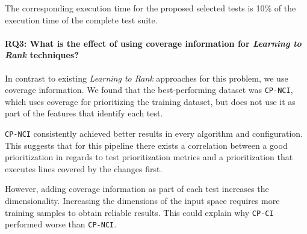 The corresponding execution time for the proposed selected tests  is 10\% of the execution time
of the complete test suite.

\paragraph{RQ3: What is the effect of using coverage information for \emph{Learning to Rank} techniques?}

In contrast to existing \emph{Learning to Rank} approaches for this problem,
we use coverage information. We found that the best-performing dataset was \texttt{CP-NCI},
which uses coverage for prioritizing the training dataset, but does not use it as part
of the features that identify each test. 

\texttt{CP-NCI} consistently achieved better results in every algorithm and
configuration. This suggests that for this pipeline there exists a correlation between a good prioritization
in regards to test prioritization metrics and a prioritization that executes lines covered by the changes first. 

However, adding coverage information as part of each test increases the dimensionality. Increasing the dimensions of the input 
space requires more training samples to obtain reliable results. This could explain why \texttt{CP-CI} performed worse than \texttt{CP-NCI}.

%
